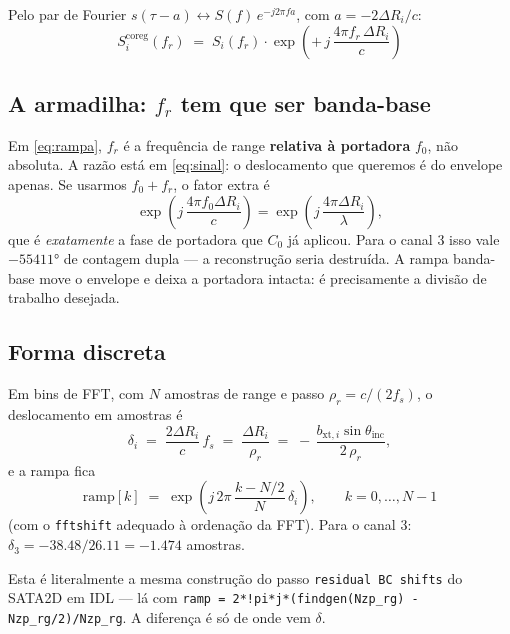 \documentclass[11pt,a4paper]{article}
\newcommand{\thi}{\theta_{\mathrm{inc}}}
\newcommand{\rhor}{\rho_{r}}
\begin{document}
Pelo par de Fourier $s(\tau - a) \leftrightarrow S(f)\,e^{-j2\pi f a}$, com
$a = -2\Delta R_i/c$:
\begin{equation}
\boxed{\;
S_i^{\mathrm{coreg}}(f_r) \;=\; S_i(f_r)\cdot
\exp\!\left(+\,j\,\frac{4\pi f_r\, \Delta R_i}{c}\right)
\;}
\label{eq:rampa}
\end{equation}

\subsection{A armadilha: $f_r$ tem que ser banda-base}

Em \eqref{eq:rampa}, $f_r$ é a frequência de range \textbf{relativa à
portadora} $f_0$, não absoluta. A razão está em \eqref{eq:sinal}: o
deslocamento que queremos é do envelope apenas. Se usarmos $f_0 + f_r$, o
fator extra é
\begin{equation}
\exp\!\left(j\,\frac{4\pi f_0 \Delta R_i}{c}\right)
= \exp\!\left(j\,\frac{4\pi \Delta R_i}{\lambda}\right),
\end{equation}
que é \emph{exatamente} a fase de portadora que $C_0$ já aplicou. Para o
canal 3 isso vale $-\num{55411}\si{\degree}$ de contagem dupla --- a
reconstrução seria destruída. A rampa banda-base move o envelope e deixa a
portadora intacta: é precisamente a divisão de trabalho desejada.

\subsection{Forma discreta}

Em bins de FFT, com $N$ amostras de range e passo
$\rhor = c/(2 f_s)$, o deslocamento em amostras é
\begin{equation}
\delta_i \;=\; \frac{2\Delta R_i}{c}\,f_s \;=\; \frac{\Delta R_i}{\rhor}
\;=\; -\,\frac{b_{\mathrm{xt},i}\sin\thi}{2\,\rhor},
\end{equation}
e a rampa fica
\begin{equation}
\mathrm{ramp}[k] \;=\; \exp\!\left(j\,2\pi\,\frac{k - N/2}{N}\,\delta_i\right),
\qquad k = 0,\dots,N-1
\end{equation}
(com o \texttt{fftshift} adequado à ordenação da FFT). Para o canal 3:
$\delta_3 = -\num{38.48}/\num{26.11} = -\num{1.474}$ amostras.

Esta é literalmente a mesma construção do passo \texttt{residual BC shifts}
do SATA2D em IDL --- lá com \texttt{ramp = 2*!pi*j*(findgen(Nzp\_rg) -
Nzp\_rg/2)/Nzp\_rg}. A diferença é só de onde vem $\delta$.
\end{document}
